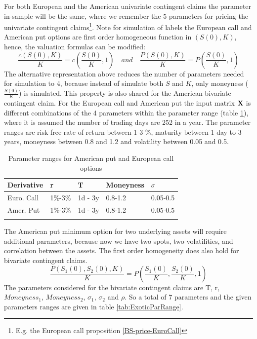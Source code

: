 For both European and the American univariate contingent claims the parameter in-sample will be the same, where we remember the 5 parameters for pricing the  univariate contingent claims\footnote{E.g. the European call proposition \ref{BS-price-EuroCall}}. Note for simulation of labels the European call and American put options are first order homogeneous function in $(S(0),K)$, hence, the valuation formulas can be modified:
$$\frac{c(S(0),K)}{K}=c(\frac{S(0)}{K},1) \quad and \quad \frac{P(S(0),K)}{K}=P(\frac{S(0)}{K},1)$$
The alternative representation above reduces the number of parameters needed for simulation to 4, because instead of simulate both $S$ and $K$, only moneyness ($\frac{S(0)}{K}$) is  simulated. This property is also shared for the American bivariate contingent claim. For the European call and American put the input matrix $\mathbf{X}$ is different combinations of the 4 parameters within the parameter range (table \ref{tab:vanillaParRange}), where it is assumed the number of trading days are 252 in a year. The parameter ranges are risk-free rate of return between 1-3 \%, maturity between 1 day to 3 years, moneyness between 0.8 and 1.2 and volatility between 0.05 and 0.5. \\

\begin{table}[th]
\caption[Parameter Ranges In-sample for MLPs on Univariate Contingent Claims]{Parameter ranges for American put and European call options}
\label{tab:vanillaParRange}
\centering
\begin{tabular}{l l l l l}
\toprule
\textbf{Derivative} & \textbf{r} & \textbf{T} & \textbf{Moneyness} & $\sigma$ \\
\midrule
Euro. Call & 1\%-3\% & 1d - 3y & 0.8-1.2 & 0.05-0.5\\ 
Amer. Put & 1\%-3\% & 1d - 3y & 0.8-1.2 & 0.05-0.5\\ 
\bottomrule\\
\end{tabular}
\end{table}

The American put minimum option for two underlying assets will require additional parameters, because now we have two spots, two volatilities, and correlation between the assets. The first order homogeneity does also hold for bivariate contingent claims.
$$\frac{P(S_1(0),S_2(0),K)}{K}=P(\frac{S_1(0)}{K}, \frac{S_2(0)}{K},1)$$
The parameters considered for the bivariate contingent claims are T, r, $Moneyness_1$, $Moneyness_2$, $\sigma_1$, $\sigma_2$ and $\rho$. So a total of 7 parameters and the given parameters ranges are given in table \ref{tab:ExoticParRange}.\\
   

